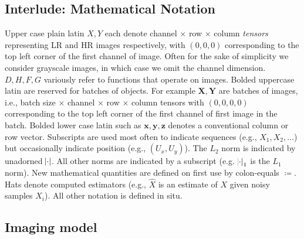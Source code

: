 \subsection{Interlude: Mathematical Notation}\label{subsec:notation}

Upper case plain latin \(X, Y\) each denote channel \(\times\) row \(\times\) column \textit{tensors} representing LR and HR images respectively, with \((0, 0,0)\) corresponding to the top left corner of the first channel of image.
%
Often for the sake of simplicity we consider grayscale images, in which case we omit the channel dimension.
%
\(D, H, F, G\) variously refer to functions that operate on images.
%
Bolded uppercase latin are reserved for batches of objects.
%
For example \(\bm{X}, \bm{Y}\) are batches of images, i.e., batch size \(\times\) channel \(\times\) row \(\times\) column tensors with \((0, 0, 0,0)\) corresponding to the top left corner of the first channel of first image in the batch.
%
Bolded lower case latin such as \(\bm{x}, \bm{y}, \bm{z}\) denotes a conventional column or row vector.
%
Subscripts are used most often to indicate sequences (e.g., \(X_1, X_2, \dots\)) but occasionally indicate position (e.g., \((U_x, U_y)\)).
%
The \(L_2\) norm is indicated by unadorned \(\abs{\cdot}\).
%
All other norms are indicated by a subscript (e.g. \(\abs{\cdot}_1\) is the \(L_1\) norm).
%
New mathematical quantities are defined on first use by colon-equals \(\coloneqq\).
%
Hats denote computed estimators (e.g., \(\hat{X}\) is an estimate of \(X\) given noisy samples \(X_i\)).
%
All other notation is defined in situ.

\subsection{Imaging model}\label{subsec:imaging-model}


